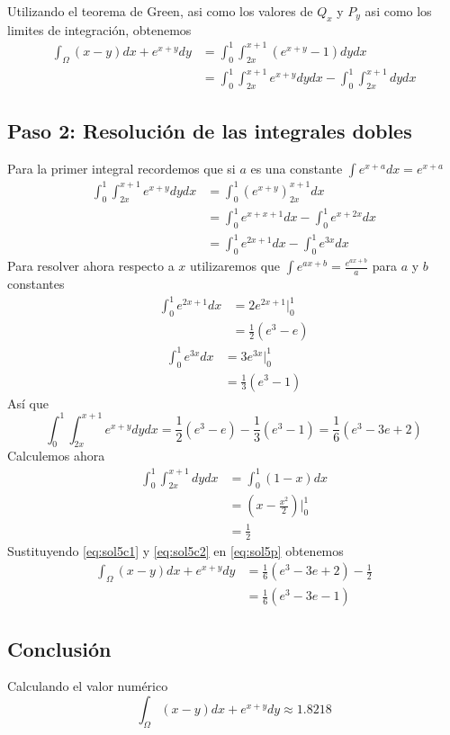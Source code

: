         Utilizando el teorema de Green, asi como los valores de $Q_x$ y $P_y$ asi como los limites de integración, obtenemos
        \begin{align}
            \int_\Omega (x - y)dx + e^{x+y}dy & = \int_0^1\int_{2x}^{x+1} (e^{x + y} - 1) dy dx \\
            & = \int_0^1\int_{2x}^{x+1}e^{x + y} dy dx - \int_0^1\int_{2x}^{x+1} dy dx
            \label{eq:sol5p}
        \end{align}
    \subsection*{Paso 2: Resolución de las integrales dobles}
        Para la primer integral recordemos que si $a$ es una constante $\int e^{x+a} dx = e^{x+a}$
        \begin{align*}
            \int_0^1\int_{2x}^{x+1} e^{x + y} dy dx & = \int_0^1 \left(e^{x + y}\right)_{2x}^{x+1} dx \\
            & = \int_0^1 e^{x + x + 1}dx - \int_0^1 e^{x + 2x}dx \\
            & = \int_0^1 e^{2x + 1}dx - \int_0^1 e^{3x}dx
        \end{align*}
        Para resolver ahora respecto a $x$ utilizaremos que $\int e^{ax + b} = \frac{e^{ax+b}}{a}$ para $a$ y $b$ constantes
        \begin{align*}
            \int_0^1 e^{2x + 1}dx & = 2 e^{2x + 1} |_0^1 \\
            & = \frac{1}{2}(e^3 - e)
        \end{align*}
        \begin{align*}
            \int_0^1 e^{3x}dx & = 3 e^{3x} |_0^1 \\
            & = \frac{1}{3}(e^3 - 1)
        \end{align*}
        Así que
        \begin{equation}
            \int_0^1\int_{2x}^{x+1} e^{x + y} dy dx = \frac{1}{2}(e^3 - e) - \frac{1}{3}(e^3 - 1) = \frac{1}{6}(e^3 -3e + 2)
            \label{eq:sol5c1}
        \end{equation} 
        Calculemos ahora
        \begin{align*}
            \int_0^1\int_{2x}^{x+1} dy dx & = \int_0^1(1-x) dx \\
            & = \left(x - \frac{x^2}{2}\right)|_0^1 \\
            & = \frac{1}{2}
            \label{eq:sol5c2} 
        \end{align*}
        Sustituyendo \eqref{eq:sol5c1} y \eqref{eq:sol5c2} en \eqref{eq:sol5p} obtenemos
        \begin{align}
            \int_\Omega (x - y)dx + e^{x+y}dy & = \frac{1}{6}(e^3 -3e + 2) - \frac{1}{2} \\
            & = \frac{1}{6}(e^3 -3e - 1)
        \end{align}
\subsection*{Conclusión}
    Calculando el valor numérico
    \begin{equation*}
        \boxed{ \int_\Omega (x - y)dx + e^{x+y}dy \approx 1.8218 }
    \end{equation*}